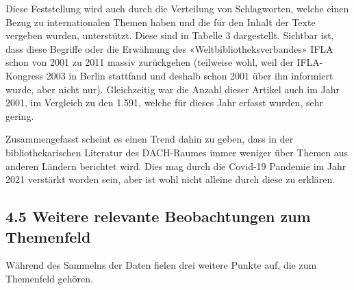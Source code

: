 \documentclass[a4paper,
fontsize=11pt,
oneside,
numbers=noperiodatend,
parskip=half-,
bibliography=totoc,
final
]{scrartcl}
\begin{document}
Diese Feststellung wird auch durch die Verteilung von Schlagworten,
welche einen Bezug zu internationalen Themen haben und die für den
Inhalt der Texte vergeben wurden, unterstützt. Diese sind in Tabelle 3
dargestellt. Sichtbar ist, dass diese Begriffe oder die Erwähnung des
«Weltbibliotheksverbandes» IFLA schon von 2001 zu 2011 massiv
zurückgehen (teilweise wohl, weil der IFLA-Kongress 2003 in Berlin
stattfand und deshalb schon 2001 über ihn informiert wurde, aber nicht
nur). Gleichzeitig war die Anzahl dieser Artikel auch im Jahr 2001, im
Vergleich zu den 1.591, welche für dieses Jahr erfasst wurden, sehr
gering.

Zusammengefasst scheint es einen Trend dahin zu geben, dass in der
bibliothekarischen Literatur des DACH-Raumes immer weniger über Themen
aus anderen Ländern berichtet wird. Dies mag durch die Covid-19 Pandemie
im Jahr 2021 verstärkt worden sein, aber ist wohl nicht alleine durch
diese zu erklären.

\hypertarget{weitere-relevante-beobachtungen-zum-themenfeld}{%
\subsection{4.5 Weitere relevante Beobachtungen zum
Themenfeld}\label{weitere-relevante-beobachtungen-zum-themenfeld}}

Während des Sammelns der Daten fielen drei weitere Punkte auf, die zum
Themenfeld gehören.
\end{document}
